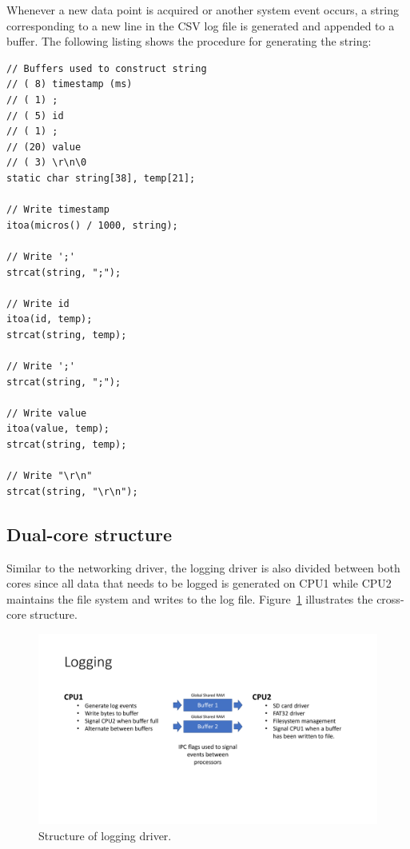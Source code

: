 Whenever a new data point is acquired or another system event occurs, a string corresponding to a new line in the CSV log file is generated and appended to a buffer. The following listing shows the procedure for generating the string:

\begin{verbatim}
// Buffers used to construct string
// ( 8) timestamp (ms)
// ( 1) ;
// ( 5) id
// ( 1) ;
// (20) value
// ( 3) \r\n\0
static char string[38], temp[21];

// Write timestamp
itoa(micros() / 1000, string);

// Write ';'
strcat(string, ";");

// Write id
itoa(id, temp);
strcat(string, temp);

// Write ';'
strcat(string, ";");

// Write value
itoa(value, temp);
strcat(string, temp);

// Write "\r\n"
strcat(string, "\r\n");
\end{verbatim}

\subsection{Dual-core structure}

Similar to the networking driver, the logging driver is also divided between both cores since all data that needs to be logged is generated on CPU1 while CPU2 maintains the file system and writes to the log file. Figure~\ref{fig:logging_structure} illustrates the cross-core structure.

\begin{figure}[H]
    \centering \includegraphics[width=1.0\textwidth]{./figures/logging_structure.pdf}
    \caption{Structure of logging driver.}
    \label{fig:logging_structure}
\end{figure}

